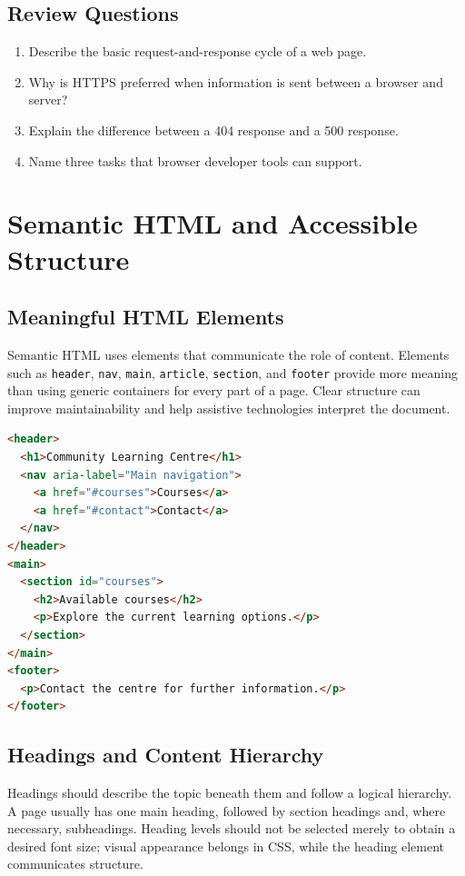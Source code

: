 \documentclass[11pt,openany,oneside]{book}
\begin{document}
\section*{Review Questions}
\begin{enumerate}
\item Describe the basic request-and-response cycle of a web page.
\item Why is HTTPS preferred when information is sent between a browser and server?
\item Explain the difference between a 404 response and a 500 response.
\item Name three tasks that browser developer tools can support.
\end{enumerate}

\chapter{Semantic HTML and Accessible Structure}
\section{Meaningful HTML Elements}
Semantic HTML uses elements that communicate the role of content. Elements such as \texttt{header}, \texttt{nav}, \texttt{main}, \texttt{article}, \texttt{section}, and \texttt{footer} provide more meaning than using generic containers for every part of a page. Clear structure can improve maintainability and help assistive technologies interpret the document.

\begin{lstlisting}[style=webcode,language=HTML]
<header>
  <h1>Community Learning Centre</h1>
  <nav aria-label="Main navigation">
    <a href="#courses">Courses</a>
    <a href="#contact">Contact</a>
  </nav>
</header>
<main>
  <section id="courses">
    <h2>Available courses</h2>
    <p>Explore the current learning options.</p>
  </section>
</main>
<footer>
  <p>Contact the centre for further information.</p>
</footer>
\end{lstlisting}

\section{Headings and Content Hierarchy}
Headings should describe the topic beneath them and follow a logical hierarchy. A page usually has one main heading, followed by section headings and, where necessary, subheadings. Heading levels should not be selected merely to obtain a desired font size; visual appearance belongs in CSS, while the heading element communicates structure.
\end{document}
